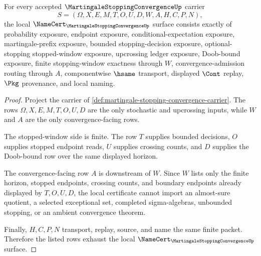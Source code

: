 \begin{theorem}
\label{thm:martingale-stopping-convergence-namecert-obligations}
For every accepted $\MartingaleStoppingConvergenceUp$ carrier
$$
S=(\Omega,X,E,M,T,O,U,D,W,A,H,C,P,N),
$$
the local $\NameCert_{\MartingaleStoppingConvergenceUp}$ surface consists exactly of probability exposure, endpoint exposure, conditional-expectation exposure, martingale-prefix exposure, bounded stopping-decision exposure, optional-stopping stopped-window exposure, upcrossing ledger exposure, Doob-bound exposure, finite stopping-window exactness through $W$, convergence-admission routing through $A$, componentwise $\hsame$ transport, displayed $\Cont$ replay, $\Pkg$ provenance, and local naming.
\end{theorem}
\begin{proof}
Project the carrier of \autoref{def:martingale-stopping-convergence-carrier}. The rows $\Omega,X,E,M,T,O,U,D$ are the only stochastic and upcrossing inputs, while $W$ and $A$ are the only convergence-facing rows.

The stopped-window side is finite. The row $T$ supplies bounded decisions, $O$ supplies stopped endpoint reads, $U$ supplies crossing counts, and $D$ supplies the Doob-bound row over the same displayed horizon.

The convergence-facing row $A$ is downstream of $W$. Since $W$ lists only the finite horizon, stopped endpoints, crossing counts, and boundary endpoints already displayed by $T,O,U,D$, the local certificate cannot import an almost-sure quotient, a selected exceptional set, completed sigma-algebras, unbounded stopping, or an ambient convergence theorem.

Finally, $H,C,P,N$ transport, replay, source, and name the same finite packet. Therefore the listed rows exhaust the local $\NameCert_{\MartingaleStoppingConvergenceUp}$ surface.
\end{proof}

